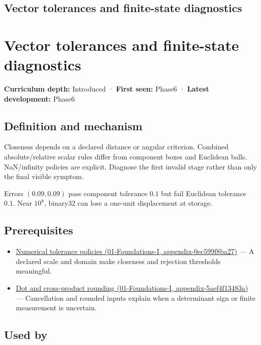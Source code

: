 \hypertarget{appendix-b5b83329215b}{}
\section*{Vector tolerances and finite-state diagnostics}
\chapter{Vector tolerances and finite-state diagnostics}\label{appendix-b5b83329215b-vector-tolerances-and-finite-state-diagnostics}

\textbf{Curriculum depth:} Introduced · \textbf{First seen:} Phase6 · \textbf{Latest development:} Phase6

\section{Definition and mechanism}\label{appendix-b5b83329215b-definition-and-mechanism}

Closeness depends on a declared distance or angular criterion. Combined absolute/relative scalar rules differ from component boxes and Euclidean balls. NaN/infinity policies are explicit. Diagnose the first invalid stage rather than only the final visible symptom.

Errors \((0.09,0.09)\) pass component tolerance \(0.1\) but fail Euclidean tolerance \(0.1\). Near \(10^8\), binary32 can lose a one-unit displacement at storage.

\section{Prerequisites}\label{appendix-b5b83329215b-prerequisites}

\begin{itemize}
\tightlist
\item
  \href{../01-Foundations-I/main.pdf\#nameddest=appendix-0ec599f8ba27}{Numerical tolerance policies (01-Foundations-I, appendix-0ec599f8ba27)} --- A declared scale and domain make closeness and rejection thresholds meaningful.
\item
  \href{../01-Foundations-I/main.pdf\#nameddest=appendix-5aef4f13483a}{Dot and cross-product rounding (01-Foundations-I, appendix-5aef4f13483a)} --- Cancellation and rounded inputs explain when a determinant sign or finite measurement is uncertain.
\end{itemize}

\section{Used by}\label{appendix-b5b83329215b-used-by}

